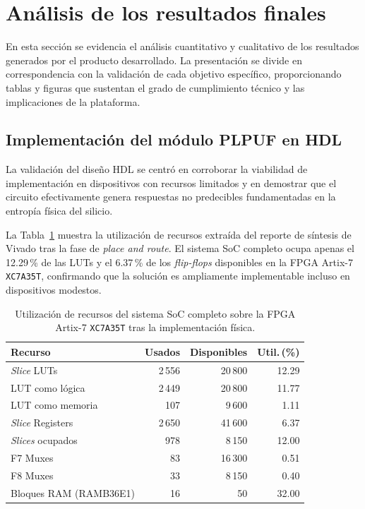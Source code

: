 \section{Análisis de los resultados finales}
\label{sec:trabajo_resultados}

En esta sección se evidencia el análisis cuantitativo y cualitativo de los
resultados generados por el producto desarrollado. La presentación se divide en
correspondencia con la validación de cada objetivo específico, proporcionando
tablas y figuras que sustentan el grado de cumplimiento técnico y las
implicaciones de la plataforma.

\subsection{Implementación del módulo PLPUF en HDL}
\label{sec:res_oe1}

La validación del diseño HDL se centró en corroborar la viabilidad de
implementación en dispositivos con recursos limitados y en demostrar que el
circuito efectivamente genera respuestas no predecibles fundamentadas en la
entropía física del silicio.

La Tabla~\ref{tab:utilizacion_global} muestra la utilización de recursos extraída
del reporte de síntesis de Vivado tras la fase de \textit{place and route}.
El sistema SoC completo ocupa apenas el 12.29\,\% de las LUTs y el 6.37\,\% de los
\textit{flip-flops} disponibles en la FPGA Artix-7 \texttt{XC7A35T}, confirmando
que la solución es ampliamente implementable incluso en dispositivos modestos.

\begin{table}[htbp]
\centering
\caption{Utilización de recursos del sistema SoC completo sobre la FPGA
  Artix-7 \texttt{XC7A35T} tras la implementación física.}
\label{tab:utilizacion_global}
\small
\renewcommand{\arraystretch}{1.2}
\begin{tabular}{lrrr}
\hline
\textbf{Recurso} & \textbf{Usados} & \textbf{Disponibles} & \textbf{Util.\,(\%)} \\
\hline
\textit{Slice} LUTs                & 2\,556 & 20\,800 & 12.29 \\
\quad LUT como lógica              & 2\,449 & 20\,800 & 11.77 \\
\quad LUT como memoria             & 107    & 9\,600  & 1.11  \\
\textit{Slice} Registers           & 2\,650 & 41\,600 & 6.37  \\
\textit{Slices} ocupados           & 978    & 8\,150  & 12.00 \\
F7 Muxes                           & 83     & 16\,300 & 0.51  \\
F8 Muxes                           & 33     & 8\,150  & 0.40  \\
Bloques RAM (RAMB36E1)             & 16     & 50      & 32.00 \\
\hline
\end{tabular}
\end{table}

